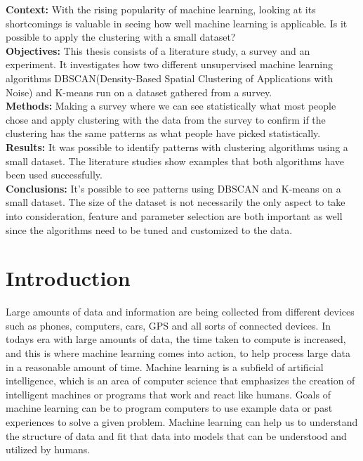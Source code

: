 \documentclass[a4paper]{article}
\begin{document}
\newpage
\begin{abstract}
\end{abstract}
% 
% 
\textbf{Context:} With the rising popularity of machine learning, looking at its shortcomings is valuable in seeing how well machine learning is applicable. Is it possible to apply the clustering with a small dataset?\\
\textbf{Objectives:} This thesis consists of a literature study, a survey and an experiment. It investigates how two different unsupervised machine learning algorithms DBSCAN(Density-Based Spatial Clustering of Applications with Noise) and K-means run on a dataset gathered from a survey.\\
\textbf{Methods:} Making a survey where we can see statistically what most people chose and apply clustering with the data from the survey to confirm if the clustering has the same patterns as what people have picked statistically.\\
\textbf{Results:} It was possible to identify patterns with clustering algorithms using a small dataset. The literature studies show examples that both algorithms have been used successfully. \\
\textbf{Conclusions:} It's possible to see patterns using DBSCAN and K-means on a small dataset. The size of the dataset is not necessarily the only aspect to take into consideration, feature and parameter selection are both important as well since the algorithms need to be tuned and customized to the data.
\newpage
\tableofcontents
\newpage

\section{Introduction}

Large amounts of data and information are being collected from different devices such as phones, computers, cars, GPS and all sorts of connected devices. In todays era with large amounts of data, the time taken to compute is increased, and this is where machine learning comes into action, to help process large data in a reasonable amount of time. Machine learning is a subfield of artificial intelligence, which is an area of computer science that emphasizes the creation of intelligent machines or programs that work and react like humans. Goals of machine learning can be to program computers to use example data or past experiences to solve a given problem. Machine learning can help us to understand the structure of data and fit that data into models that can be understood and utilized by humans. 
\end{document}
